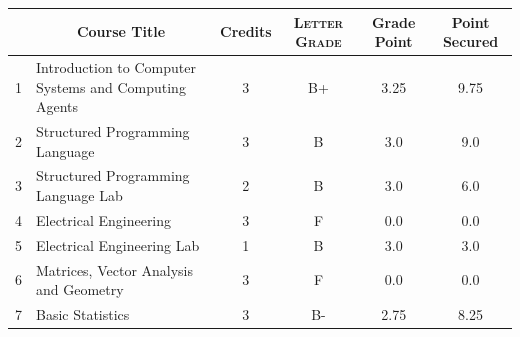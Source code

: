 \documentclass[11pt]{article}
\newcommand*{\numtwo}[1]{\pgfmathprintnumber[
                    fixed, precision=2, fixed zerofill=true]{#1}}
\begin{document}
                \begin{center}
                    \renewcommand{\arraystretch}{1.08}
                    
                \begin{tabular}{|c|l|c|>{\scshape}c|c|c|}
                \hline  \rule[-1ex]{0pt}{3.5ex} {\centering{\bf Course Code}} &  \multicolumn{1}{c|}{\textbf{Course Title}}  & {\bf Credits} & {\bf Letter Grade} & {\bf Grade Point} & {\bf Point Secured}  \\ 
                \hline   1 &  Introduction to Computer Systems and Computing Agents		 & 3 & B+ & 3.25 & 9.75 \\ %
                \hline   2 &  Structured Programming Language		 & 3 & B & 3.0 & 9.0 \\ %
                \hline   3 &  Structured Programming Language Lab		 & 2 & B & 3.0 & 6.0 \\ %
                \hline   4 &  Electrical Engineering		 & 3 & F & 0.0 & 0.0 \\ %
                \hline   5 &  Electrical Engineering Lab		 & 1 & B & 3.0 & 3.0 \\ %
                \hline   6 &  Matrices, Vector Analysis and Geometry		 & 3 & F & 0.0 & 0.0 \\ %
                \hline   7 &  Basic Statistics		 & 3 & B- & 2.75 & 8.25 \\ %

\hline                %
                \end{tabular}
                \end{center}
                \renewcommand{\arraystretch}{1.03}
\end{document}
